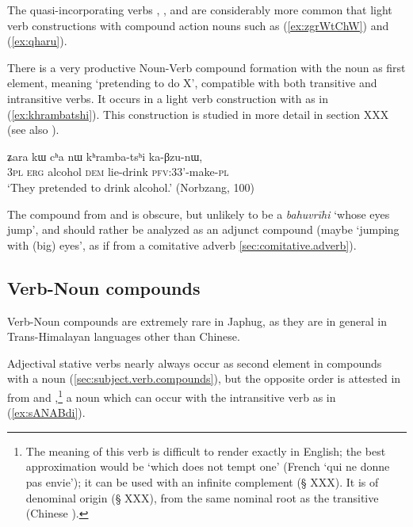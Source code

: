 The quasi-incorporating verbs , , and  are considerably more common that light verb constructions with compound action nouns such as (\ref{ex:zgrWtChW}) and (\ref{ex:qharu}).

There is a very productive Noun-Verb compound formation with the noun  as first element, meaning `pretending to do  X', compatible with both transitive and intransitive verbs. It occurs in a light verb construction with  as in (\ref{ex:khrambatshi}). This construction is studied in more detail in section XXX (see also \citealt[252]{jacques16complementation}).

\begin{exe}
\ex \label{ex:khrambatshi}
\gll ʑara kɯ cʰa nɯ kʰramba-tsʰi ka-βzu-nɯ,  \\
\textsc{3pl} \textsc{erg} alcohol \textsc{dem} lie-drink \textsc{pfv}:3\fl{}3'-make-\textsc{pl} \\
\glt `They pretended to drink alcohol.' (Norbzang, 100)
\end{exe}

The compound  from  and  is obscure, but unlikely to be a \textit{bahuvrīhi} `whose eyes jump', and should rather be analyzed as an adjunct compound (maybe `jumping with (big) eyes', as if from a comitative adverb \ref{sec:comitative.adverb}). 

\subsection{Verb-Noun compounds} \label{sec.v.n.compounds}
Verb-Noun compounds are extremely rare in Japhug, as they are in general in Trans-Himalayan languages other than Chinese.  

Adjectival stative verbs nearly always occur as second element in compounds with a noun (\ref{sec:subject.verb.compounds}), but the opposite order is attested in  from  and ,\footnote{The meaning of this verb is difficult to render exactly in English; the best approximation would be `which does not tempt one' (French `qui ne donne pas envie'); it can be used with an infinite complement (§ XXX). It is of denominal origin (§ XXX), from the same nominal root as the transitive  (Chinese ). }  a noun which can occur with the intransitive verb  as in (\ref{ex:sANABdi}).

